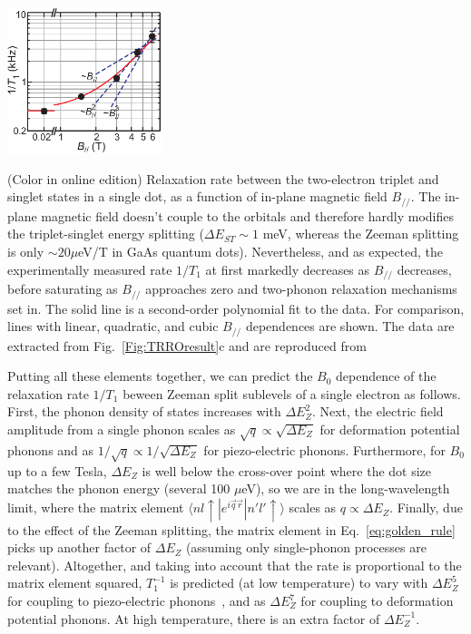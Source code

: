 \documentclass[rmp,twocolumn,aps]{revtex4}
\begin{document}
\bfig
\begin{center}
\includegraphics[width=4.5cm]{hanson_fig22.eps}
\end{center}
\caption{(Color in online edition) Relaxation rate between the two-electron triplet and
singlet states in a single dot, as a function of in-plane magnetic
field $B_{//}$. The in-plane magnetic field doesn't couple to the orbitals and therefore hardly modifies the triplet-singlet energy splitting ($\Delta E_{ST} \sim 1$ meV, whereas the Zeeman splitting is only $\sim 20 \mu$eV/T in GaAs quantum dots). Nevertheless, and as expected, the experimentally measured rate $1/T_1$ at first markedly decreases as $B_{//}$ decreases, before saturating as $B_{//}$ approaches zero and two-phonon relaxation mechanisms set in. The solid line is a second-order polynomial fit to the data. For comparison, lines with linear, quadratic, and cubic $B_{//}$ dependences are shown. The data are extracted from Fig.~\ref{Fig:TRROresult}c and are reproduced from~\cite{HansonPRL2005}}
\label{fig:T1_vs_zeeman} 
\efig

Putting all these elements together, we can predict the $B_0$ dependence
of the relaxation rate $1/T_1$ beween Zeeman split sublevels of a
single electron as follows. First, the phonon density of states
increases with $\Delta E_{Z}^2$. Next, the electric field amplitude from
a single phonon scales as  $\sqrt{q}\propto\sqrt{\Delta E_Z}$ for
deformation potential phonons and as $1/\sqrt{q} \propto
1/\sqrt{\Delta E_Z}$ for piezo-electric phonons. Furthermore, for $B_0$
up to a few Tesla, $\Delta E_Z$ is well below the cross-over point
where the dot size matches the phonon energy (several 100
$\mu$eV), so we are in the long-wavelength limit, where the
matrix element $\langle n l \uparrow | e^{i\vec{q}\vec{r}} | n' l' \uparrow \rangle$ scales as $q\propto \Delta E_Z$.
Finally, due to the effect of the Zeeman splitting, the matrix
element in Eq.~\ref{eq:golden_rule} picks up another factor of
$\Delta E_Z$ (assuming only single-phonon processes are relevant). Altogether, and taking into account that the rate is proportional to the matrix element squared, $T_1^{-1}$ is predicted (at low temperature) to vary with $\Delta E_Z^5$ for coupling to piezo-electric phonons~\cite{khaetskii01}, and as $\Delta E_Z^7$ for coupling to deformation potential phonons. At high temperature, there is an extra factor of $\Delta E_Z^{-1}$.
\end{document}
